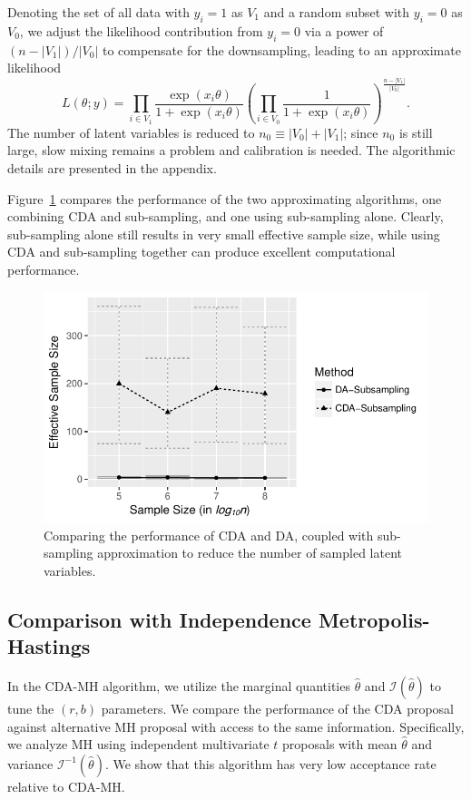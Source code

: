 \documentclass[twoside,11pt]{article}
\newcommand{\mc}[1]{\mathcal{#1}}
\newcommand{\1}{\mathbf 1}
\begin{document}
{Denoting the set of all data with $y_i=1$ as $V_1$ and a random subset  with $y_i=0$ as $V_0$, we adjust the likelihood contribution from $y_i=0$ via a power of $({n-|V_1|})/{|V_0|}$ to compensate for the downsampling, leading to an approximate likelihood
$$L(\theta;y) = \prod_{i\in V_1}\frac{\exp(x_i\theta)}{ 1+\exp(x_i\theta)} \left (\prod_{i\in V_0}\frac{1}{ 1+\exp(x_i\theta)}
\right)^{\frac{n-|V_1|}{|V_0|}}.$$
The number of latent variables is reduced to $n_0 \equiv |V_0|+|V_1|$; since
$n_0$ is still large, slow mixing remains a problem and calibration is needed. The algorithmic details are presented in the appendix.


Figure~\ref{simMassiveNSubsampling} compares the performance of the two approximating
algorithms, one  combining CDA and sub-sampling, and one  using sub-sampling alone. Clearly, sub-sampling alone still results in very small
effective sample size, while using CDA and sub-sampling together can produce excellent computational performance.
\begin{figure}[H]
\centering
  \includegraphics[width=0.55\linewidth]{simMassiveNSubsampling}
    {\caption{Comparing the performance of CDA and DA, coupled with sub-sampling
 approximation to reduce the number of sampled latent variables. \label{simMassiveNSubsampling}}} %
\end{figure}

\subsection{Comparison with Independence Metropolis-Hastings}
In the CDA-MH algorithm, we utilize the marginal quantities $\hat \theta$ and $\mc I(\hat\theta)$ to tune the $(r,b)$ parameters. We compare the performance of the CDA proposal against alternative MH proposal with access to the same information. Specifically, we analyze MH using independent multivariate $t$ proposals with mean $\hat \theta$ and variance $\mc I^{-1}(\hat\theta)$. We show that this algorithm has very low acceptance rate relative to CDA-MH.

}
\end{document}
